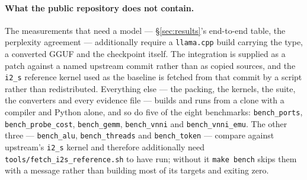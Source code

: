 \documentclass[11pt,a4paper]{article}
\newcommand{\code}[1]{\texttt{#1}}
\begin{document}
\paragraph{What the public repository does not contain.} The measurements that
need a model --- \S\ref{sec:results}'s end-to-end table, the perplexity
agreement --- additionally require a \code{llama.cpp} build carrying the type, a
converted GGUF and the checkpoint itself. The integration is supplied as a patch
against a named upstream commit rather than as copied sources, and the
\code{i2\_s} reference kernel used as the baseline is fetched from that commit
by a script rather than redistributed. Everything else --- the packing, the
kernels, the suite, the converters and every evidence file --- builds and runs
from a clone with a compiler and Python alone, and so do five of the eight
benchmarks: \code{bench\_ports}, \code{bench\_probe\_cost}, \code{bench\_gemm},
\code{bench\_vnni} and \code{bench\_vnni\_emu}. The other three ---
\code{bench\_alu}, \code{bench\_threads} and \code{bench\_token} --- compare
against upstream's \code{i2\_s} kernel and therefore additionally need
\code{tools/fetch\_i2s\_reference.sh} to have run; without it \code{make bench}
skips them with a message rather than building most of its targets and exiting
zero.
\end{document}
